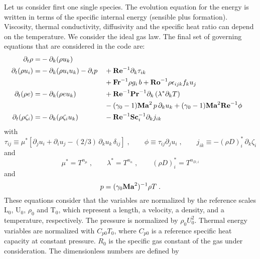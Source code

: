 Let us consider first one single species. The evolution equation for the energy is written in terms of the specific internal energy (sensible plus formation). Viscosity, thermal conductivity, diffusivity and the specific heat ratio can depend on the temperature. We consider the ideal gas law. The final set of governing equations that are considered in the code are:
\begin{subequations}
  \begin{align}
    \partial_t \rho       =& -\partial_k (\rho u_k)                                       \\
    \partial_t (\rho u_i) =& -\partial_k (\rho u_i u_k )- \partial_i p
    && +\mathrm{\bf Re}^{-1}\partial_k \tau_{ik}                                            \nonumber \\
    & && +\mathrm{\bf Fr}^{-1} \rho g_i\,b +\mathrm{\bf Ro}^{-1}\rho\epsilon_{ijk} f_ku_j                         \\
    \partial_t (\rho e)   =& -\partial_k (\rho e u_k )
    && +\mathrm{\bf Re}^{-1}\mathrm{\bf Pr}^{-1} \partial_k \left(\lambda^{*}\partial_kT\right)         \nonumber \\
    & &&-(\gamma_0-1)\mathrm{\bf Ma}^2\,p\, \partial_k u_k  + (\gamma_0-1)\mathrm{\bf Ma}^2\mathrm{\bf Re}^{-1}\phi           \\
    \partial_t (\rho \zeta_i) =& -\partial_k (\rho \zeta_i u_k)
    && -\mathrm{\bf Re}^{-1}\mathrm{\bf Sc}_i^{-1} \partial_k j_{ik}
  \end{align}
\end{subequations}
with
\begin{equation}
  \tau_{ij} \equiv \mu^*\left[\partial_j u_i +\partial_i u_j -(2/3)\, \partial_k u_k\,\delta_{ij}\right]\;,\qquad
  \phi      \equiv \tau_{ij} \partial_j u_i\;,\qquad
  j_{ik}    \equiv -(\rho D)_i^{*}\, \partial_k \zeta_i
\end{equation}
and
\begin{equation}
  \mu^{*} =  T^{n_\mu}\;,\qquad \lambda^{*} = T^{n_\kappa} \;,\qquad (\rho D)_i^{*}  =  T^{n_{D,i}}
\end{equation}
and
\begin{equation}
  p  = (\gamma_0 \mathrm{\bf Ma}^2)^{-1}\rho T \;.
  \label{eq:state}
\end{equation}
These equations consider that the variables are normalized by the reference scales $\mathrm{L}_0$, $\mathrm{U}_0$, $\rho_0$ and $\mathrm{T}_0$, which represent a length, a velocity, a density, and a temperature, respectively. The pressure is normalized by $\rho_0U_0^2$. Thermal energy variables are normalized with $C_{p0}T_0$, where $C_{p0}$ is a reference specific heat capacity at constant pressure. $R_0$ is the specific gas constant of the gas under consideration. The dimensionless numbers are defined by
